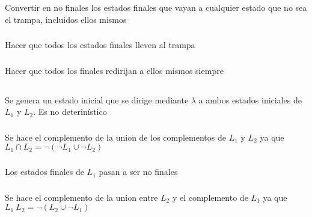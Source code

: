 \subsubsection{}
Convertir en no finales los estados finales que vayan a cualquier estado que no sea el trampa, incluidos ellos mismos

\subsubsection{}
Hacer que todos los estados finales lleven al trampa

\subsubsection{}
Hacer que todos los finales redirijan a ellos mismos siempre

\subsection{}
\subsubsection{}
Se genera un estado inicial que se dirige mediante $\lambda$ a ambos estados iniciales de $L_1$ y $L_2$. Es no deterinístico

\subsubsection{}
Se hace el complemento de la union de los complementos de $L_1$ y $L_2$ ya que $L_1 \cap L_2 = \neg (\neg L_1 \cup \neg L_2)$

\subsubsection{}
Los estados finales de $L_1$ pasan a ser no finales

\subsubsection{}
Se hace el complemento de la union entre $L_2$ y el complemento de $L_1$ ya que $L_1 \ L_2 = \neg (L_2 \cup \neg L_1)$